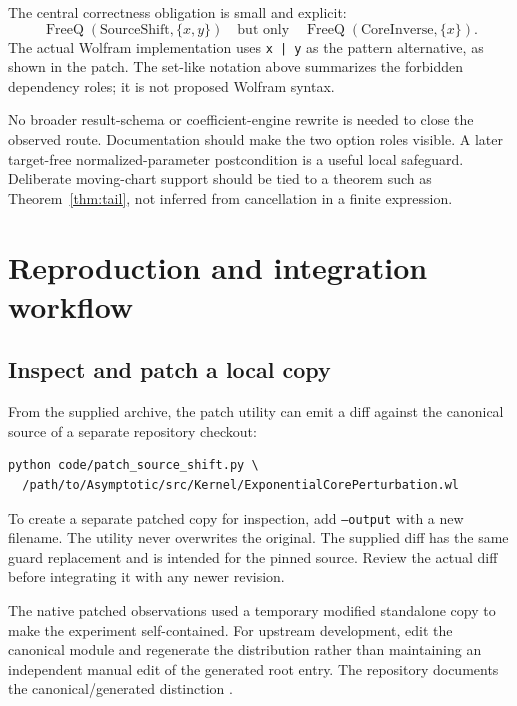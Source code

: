 \documentclass[11pt,letterpaper]{article}
\newcommand{\code}[1]{\texttt{#1}}
\begin{document}
The central correctness obligation is small and explicit:
\[
 \operatorname{FreeQ}(\text{SourceShift},\{x,y\})
 \quad\text{but only}\quad
 \operatorname{FreeQ}(\text{CoreInverse},\{x\}).
\]
The actual Wolfram implementation uses \code{x | y} as the pattern alternative, as shown in the patch. The set-like notation above summarizes the forbidden dependency roles; it is not proposed Wolfram syntax.

No broader result-schema or coefficient-engine rewrite is needed to close the observed route. Documentation should make the two option roles visible. A later target-free normalized-parameter postcondition is a useful local safeguard. Deliberate moving-chart support should be tied to a theorem such as Theorem~\ref{thm:tail}, not inferred from cancellation in a finite expression.

\appendix
\section{Reproduction and integration workflow}
\subsection{Inspect and patch a local copy}
From the supplied archive, the patch utility can emit a diff against the canonical source of a separate repository checkout:
\begin{lstlisting}
python code/patch_source_shift.py \
  /path/to/Asymptotic/src/Kernel/ExponentialCorePerturbation.wl
\end{lstlisting}
To create a separate patched copy for inspection, add \code{--output} with a new filename. The utility never overwrites the original. The supplied diff has the same guard replacement and is intended for the pinned source. Review the actual diff before integrating it with any newer revision.

The native patched observations used a temporary modified standalone copy to make the experiment self-contained. For upstream development, edit the canonical module and regenerate the distribution rather than maintaining an independent manual edit of the generated root entry. The repository documents the canonical/generated distinction \cite{source-map,repo}.
\end{document}

